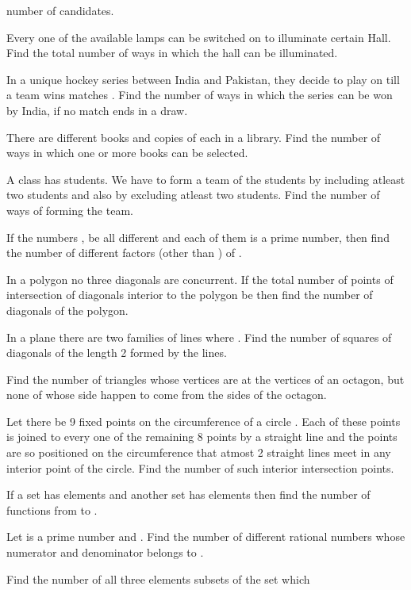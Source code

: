   number of candidates.
\item Every one of the  available lamps can be switched on to illuminate certain Hall. Find the total
  number of ways in which the hall can be illuminated.
\item In a unique hockey series between India and Pakistan, they decide to play on till a team wins 
  matches . Find the number of ways in which the series can be won by India, if no match ends in a draw.
\item There are  different books and  copies of each in a library. Find the number of ways in
  which one or more books can be selected.
\item A class has  students. We have to form a team of the students by including atleast two students and
  also by excluding atleast two students. Find the number of ways of forming the team.
\item If the  numbers , be all different and each of them is a prime
  number, then find the number of different factors (other than ) of .
\item In a polygon no three diagonals are concurrent. If the total number of points of intersection of
  diagonals interior to the polygon be  then find the number of diagonals of the polygon.
\item In a plane there are two families of lines  where . Find the number of squares of diagonals of the length 2 formed by the lines.
\item Find the number of triangles whose vertices are at the vertices of an octagon, but none of whose side
  happen to come from the sides of the octagon.
\item Let there be 9 fixed points on the circumference of a circle . Each of these points is joined to every
  one of the remaining 8 points by a straight line and the points are so positioned on the circumference
  that atmost 2 straight lines meet in any interior point of the circle. Find the number of such interior
  intersection points.
\item If a set  has  elements and another set  has  elements then find the number of
  functions from  to .
\item Let  is a prime number and . Find the number of different rational
  numbers whose numerator and denominator belongs to .
\item Find the number of all three elements subsets of the set  which
